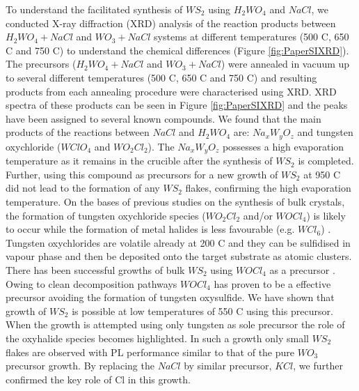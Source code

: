 To understand the facilitated synthesis of $WS_2$ using $H_2WO_4$ and $NaCl$, we conducted X-ray diffraction (XRD) analysis of the reaction products between $H_2WO_4+NaCl$ and $WO_3+NaCl$ systems at different temperatures (500 {\degree}C, 650 {\degree}C and 750 {\degree}C) to understand the chemical differences (Figure \ref{fig:PaperSIXRD}). The precursors ($H_2WO_4+NaCl$ and $WO_3+NaCl$) were annealed in vacuum up to several different temperatures (500 {\degree}C, 650 {\degree}C and 750 {\degree}C) and resulting products from each annealing procedure were characterised using XRD. XRD spectra of these products can be seen in Figure \ref{fig:PaperSIXRD} and the peaks have been assigned to several known compounds. We found that the main products of the reactions between $NaCl$ and $H_2WO_4$ are: $Na_xW_yO_z$ and tungsten oxychloride ($WClO_4$ and $WO_2Cl_2$). The $Na_xW_yO_z$ possesses a high evaporation temperature as it remains in the crucible after the synthesis of $WS_2$ is completed. Further, using this compound as precursors for a new growth of $WS_2$ at 950 {\degree}C did not lead to the formation of any $WS_2$ flakes, confirming the high evaporation temperature. On the bases of previous studies on the synthesis of bulk crystals, the formation of tungsten oxychloride species ($WO_2Cl_2$ and/or $WOCl_4$) is likely to occur while the formation of metal halides is less favourable (e.g. $WCl_6$) \cite{McKone2012}\cite{Baglio1983}. Tungsten oxychlorides are volatile already at 200 {\degree}C \cite{Turler2004} and they can be sulfidised in vapour phase and then be deposited onto the target substrate as atomic clusters. There has been successful growths of bulk $WS_2$ using $WOCl_4$ as a precursor \cite{Carmalt2003}. Owing to clean decomposition pathways $WOCl_4$ has proven to be a effective precursor avoiding the formation of tungsten oxysulfide. We have shown that growth of $WS_2$ is possible at low temperatures of 550 {\degree}C using this precursor. When the growth is attempted using only tungsten as sole precursor the role of the oxyhalide species becomes highlighted. In such a growth only small $WS_2$ flakes are observed with PL performance similar to that of the pure $WO_3$ precursor growth. By replacing the $NaCl$ by similar precursor, $KCl$, we further confirmed the key role of Cl in this growth.


